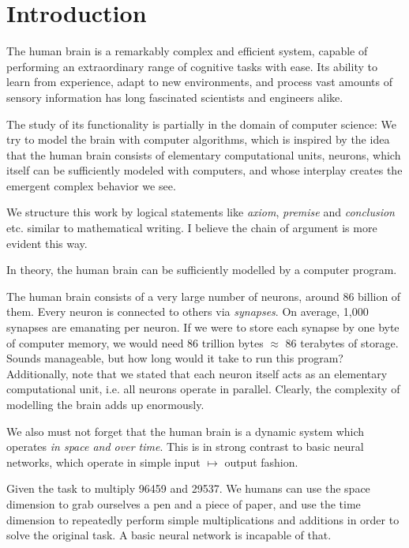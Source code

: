 \documentclass[../../main.tex]{subfiles}
\begin{document}
    \section{Introduction}
    The human brain is a remarkably complex and efficient system, capable of performing an extraordinary range of cognitive tasks with ease. Its ability to learn from experience, adapt to new environments, and process vast amounts of sensory information has long fascinated scientists and engineers alike.

    The study of its functionality is partially in the domain of computer science: We try to model the brain with computer algorithms, which is inspired by the idea that the human brain consists of elementary computational units, neurons, which itself can be sufficiently modeled with computers, and whose interplay creates the emergent complex behavior we see.

    We structure this work by logical statements like \emph{axiom}, \emph{premise} and \emph{conclusion} etc. similar to mathematical writing. I believe the chain of argument is more evident this way.

    \begin{axiom}
        In theory, the human brain can be sufficiently modelled by a computer program.
    \end{axiom}

    The human brain consists of a very large number of neurons, around 86 billion of them. Every neuron is connected to others via \emph{synapses}. On average, 1,000 synapses are emanating per neuron. If we were to store each synapse by one byte of computer memory, we would need 86 trillion bytes $\approx$ 86 terabytes of storage. Sounds manageable, but how long would it take to run this program? Additionally, note that we stated that each neuron itself acts as an elementary computational unit, i.e. all neurons operate in parallel. Clearly, the complexity of modelling the brain adds up enormously.

    We also must not forget that the human brain is a dynamic system which operates \emph{in space and over time}. This is in strong contrast to basic neural networks, which operate in simple input $\mapsto$ output fashion.

    \begin{example}
        Given the task to multiply 96459 and 29537. We humans can use the space dimension to grab ourselves a pen and a piece of paper, and use the time dimension to repeatedly perform simple multiplications and additions in order to solve the original task. A basic neural network is incapable of that.
    \end{example}
\end{document}
